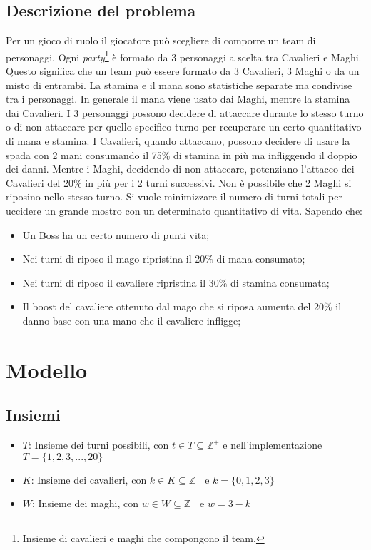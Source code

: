 \documentclass[12pt]{article}
\begin{document}
    \subsection{Descrizione del problema}
    Per un gioco di ruolo il giocatore può scegliere di comporre un team di personaggi.
    Ogni \textit{party}\footnote{Insieme di cavalieri e maghi che compongono il team.} è formato da 3 personaggi a scelta tra Cavalieri e Maghi. Questo significa che un team può essere formato da 3 Cavalieri, 3 Maghi o da un misto di entrambi. 
    La stamina e il mana sono statistiche separate ma condivise tra i personaggi. In generale
    il mana viene usato dai Maghi, mentre la stamina dai Cavalieri.
    I 3 personaggi possono decidere di attaccare durante lo stesso turno o di non attaccare per quello specifico turno per recuperare un certo quantitativo di mana e stamina.
    I Cavalieri, quando attaccano, possono decidere di usare la spada con 2 mani consumando il 75\% di stamina in più ma infliggendo il doppio dei danni. Mentre i Maghi, decidendo di non attaccare, potenziano l'attacco dei Cavalieri del 20\% in più per i 2 turni successivi. Non è possibile che 2 Maghi si riposino nello stesso turno. Si vuole minimizzare il numero di turni totali per uccidere un grande mostro con un determinato quantitativo di vita. Sapendo che:
    \begin{itemize}
        \item Un Boss ha un certo numero di punti vita;
        \item Nei turni di riposo il mago ripristina il 20$\%$ di mana consumato;
        \item Nei turni di riposo il cavaliere ripristina il 30$\%$ di stamina consumata;
        \item Il boost del cavaliere ottenuto dal mago che si riposa aumenta del 20$\%$ il danno base con una mano che il cavaliere infligge;
    \end{itemize}

    \section{Modello}
    \subsection{Insiemi}
    \begin{itemize}
        \item $T$: Insieme dei turni possibili, con $t \in T \subseteq \mathbb{Z}^+$ e nell'implementazione $T = \{1,2,3,...,20\}$
        \item $K$: Insieme dei cavalieri, con $k \in K \subseteq \mathbb{Z}^+$ e $k = \{ 0,1,2,3 \}$
        \item $W$: Insieme dei maghi, con $w \in W \subseteq \mathbb{Z}^+$ e $w = 3- k$
    \end{itemize}
\end{document}
